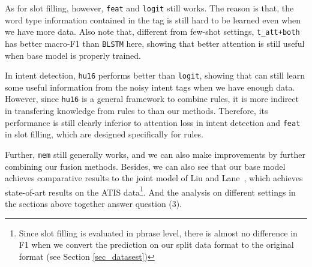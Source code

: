 As for slot filling, however, \texttt{feat} and \texttt{logit} still works. 
The reason is that, the word type information contained in the \RE tag is still hard to be learned even when we have more data. 
Also note that, different from few-shot settings, \texttt{t\_att+both} has better macro-F1 than \texttt{BLSTM} here, showing that better attention is still useful when base model is properly trained. 

In intent detection, \texttt{hu16} performs better than \texttt{logit}, showing that \NN can still learn some useful information from the noisy intent \RE tags when we have enough data.
However, since \texttt{hu16} is a general framework to combine \FOL rules, it is more indirect in transfering knowledge from rules to \NN than our methods. Therefore, its performance is still clearly inferior to attention loss in intent detection and \texttt{feat} in slot filling, which are designed specifically for \RE rules.

Further, \texttt{mem} still generally works, and we can also make improvements by further combining our fusion methods. 
Besides, we can also see that our base model achieves comparative results to the joint model of  Liu and Lane~, which achieves state-of-art results on the ATIS data\footnote{
Since slot filling is evaluated in phrase level, there is almost no difference in F1 when we convert the prediction on our split data format to the original format (see Section \ref{sec_datasest})}.
And the analysis on different settings in the sections above together answer question (3).

